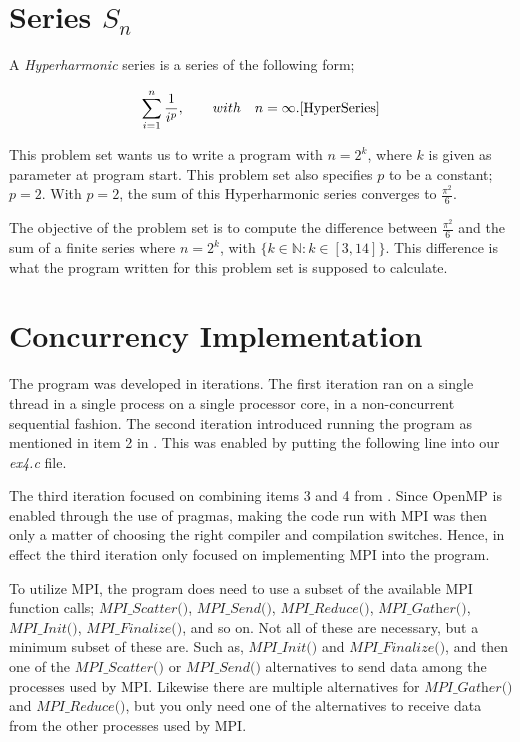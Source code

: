 \documentclass[fontsize=11pt,paper=a4,titlepage]{report}
\begin{document}
\section{Series $S_n$}

A \textit{Hyperharmonic} series is a series of the following form;

\begin{displaymath}
	\sum_{i=1}^{n} \frac{1}{i^p}, \quad \quad with \quad n = \infty.
	\ref{HyperSeries}
\end{displaymath}

This problem set wants us to write a program with $n = 2^k$, where $k$ is given
as parameter at program start. This
problem set also specifies $p$ to be a constant; $p = 2$. With $p = 2$, the sum
of this Hyperharmonic series converges to $\frac{\pi^2}{6}$.

The objective of the problem set is to compute the difference between
$\frac{\pi^2}{6}$ and the sum of a finite series where $n = 2^k$, with $\{k \in
\mathbb{N} : k \in [3, 14]\}$. This difference is what the program written for
this problem set is supposed to calculate.

\section{Concurrency Implementation}

The program was developed in iterations. The first iteration ran on a single
thread in a single process on a single processor core, in a non-concurrent
sequential fashion. The second iteration introduced running the program as
mentioned in item 2 in \cite{RunMode}. This was enabled by putting the following
line into our \textit{ex4.c} file.


The third iteration focused on combining items 3 and 4 from \cite{RunMode}.
Since OpenMP is enabled through the use of pragmas, making the code run with MPI
was then only a matter of choosing the right compiler and compilation switches.
Hence, in effect the third iteration only focused on implementing MPI into the
program.

To utilize MPI, the program does need to use a subset of the available MPI
function calls; $\textit{MPI\_Scatter()}$, $\textit{MPI\_Send()}$,
$\textit{MPI\_Reduce()}$, $\textit{MPI\_Gather()}$, $\textit{MPI\_Init()}$,
$\textit{MPI\_Finalize()}$, and so on. Not all of these are necessary, but a
minimum subset of these are. Such as, $\textit{MPI\_Init()}$ and $\textit{
MPI\_Finalize()}$, and then one of the $\textit{MPI\_Scatter()}$ or
$\textit{MPI\_Send()}$ alternatives to send data among the processes used by
MPI. Likewise there are multiple alternatives for $\textit{MPI\_Gather()}$ and
$\textit{MPI\_Reduce()}$, but you only need one of the alternatives to receive
data from the other processes used by MPI.
\end{document}

